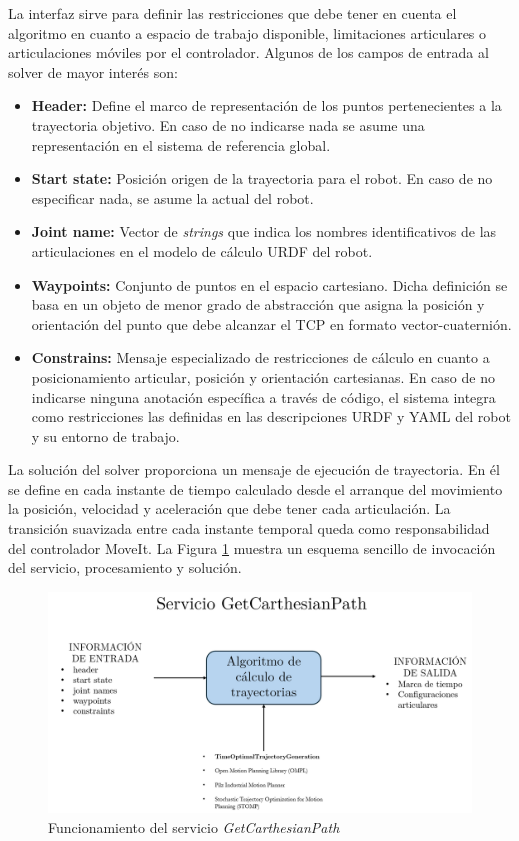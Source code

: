 La interfaz sirve para definir las restricciones que debe tener en cuenta el algoritmo en cuanto a espacio de trabajo disponible, limitaciones articulares o articulaciones móviles por el controlador. Algunos de los campos de entrada al solver de mayor interés son:
\begin{itemize}
    \item \textbf{Header:} Define el marco de representación de los puntos pertenecientes a la trayectoria objetivo. En caso de no indicarse nada se asume una representación en el sistema de referencia global.
    \item \textbf{Start state:} Posición origen de la trayectoria para el robot. En caso de no especificar nada, se asume la actual del robot.
    \item \textbf{Joint name:} Vector de \textit{strings} que indica los nombres identificativos de las articulaciones en el modelo de cálculo \acrshort{URDF} del robot.
    \item \textbf{Waypoints:} Conjunto de puntos en el espacio cartesiano. Dicha definición se basa en un objeto de menor grado de abstracción que asigna la posición y orientación del punto que debe alcanzar el \acrshort{TCP} en formato vector-cuaternión.
    \item \textbf{Constrains:} Mensaje especializado de restricciones de cálculo en cuanto a posicionamiento articular, posición y orientación cartesianas. En caso de no indicarse ninguna anotación específica a través de código, el sistema integra como restricciones las definidas en las descripciones \acrshort{URDF} y \acrshort{YAML} del robot y su entorno de trabajo.
\end{itemize}

La solución del solver proporciona un mensaje de ejecución de trayectoria. En él se define en cada instante de tiempo calculado desde el arranque del movimiento la posición, velocidad y aceleración que debe tener cada articulación. La transición suavizada entre cada instante temporal queda como responsabilidad del controlador MoveIt. La Figura \ref{fig:esquema getcarthesianpath} muestra un esquema sencillo de invocación del servicio, procesamiento y solución.

\begin{figure}[h!]
    \centering
    \includegraphics[scale=0.60]{figuras/esquema getcarthesianpath.png}
    \caption{Funcionamiento del servicio \textit{GetCarthesianPath}}
    \label{fig:esquema getcarthesianpath}
\end{figure}

